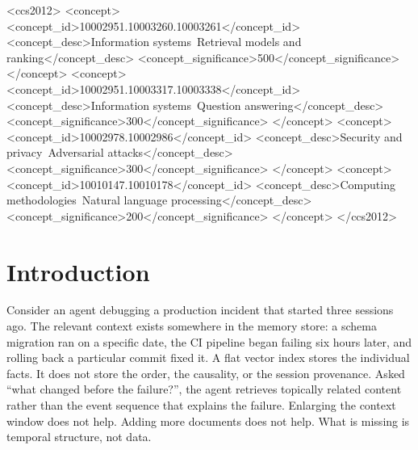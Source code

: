 \documentclass[sigconf,authordraft]{acmart}
\begin{document}
\begin{CCSXML}
<ccs2012>
 <concept>
  <concept_id>10002951.10003260.10003261</concept_id>
  <concept_desc>Information systems~Retrieval models and ranking</concept_desc>
  <concept_significance>500</concept_significance>
 </concept>
 <concept>
  <concept_id>10002951.10003317.10003338</concept_id>
  <concept_desc>Information systems~Question answering</concept_desc>
  <concept_significance>300</concept_significance>
 </concept>
 <concept>
  <concept_id>10002978.10002986</concept_id>
  <concept_desc>Security and privacy~Adversarial attacks</concept_desc>
  <concept_significance>300</concept_significance>
 </concept>
 <concept>
  <concept_id>10010147.10010178</concept_id>
  <concept_desc>Computing methodologies~Natural language processing</concept_desc>
  <concept_significance>200</concept_significance>
 </concept>
</ccs2012>
\end{CCSXML}



\maketitle

\section{Introduction}

Consider an agent debugging a production incident that started three
sessions ago. The relevant context exists somewhere in the memory store:
a schema migration ran on a specific date, the CI pipeline began failing
six hours later, and rolling back a particular commit fixed it. A flat
vector index stores the individual facts. It does not store the order,
the causality, or the session provenance. Asked ``what changed before the
failure?'', the agent retrieves topically related content rather than the
event sequence that explains the failure. Enlarging the context window
does not help. Adding more documents does not help. What is missing is
temporal structure, not data.
\end{document}
